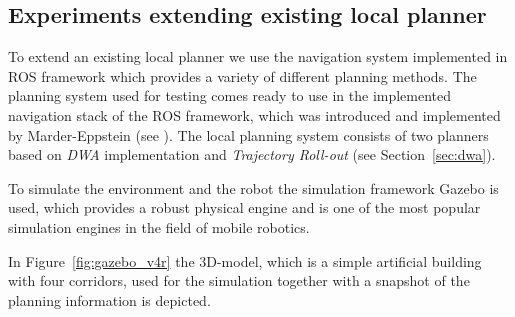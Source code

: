 \subsection{Experiments extending existing local planner}
To extend an existing local planner we use the navigation system implemented in ROS framework which provides a variety of different planning methods. 
The planning system used for testing comes ready to use in the implemented navigation stack of the ROS framework, which was introduced and implemented by Marder-Eppstein (see \cite{DBLP:conf/icra/Marder-EppsteinBFGK10}).
The local planning system consists of two planners based on \emph{DWA} implementation and \emph{Trajectory Roll-out} (see Section~\ref{sec:dwa}).

To simulate the environment and the robot the simulation framework Gazebo is used, which provides a robust physical engine and is one of the most popular simulation engines in the field of mobile robotics. 

In Figure~\ref{fig:gazebo_v4r} the 3D-model, which is a simple artificial building with four corridors, used for the simulation together with a snapshot of the planning information is depicted.

